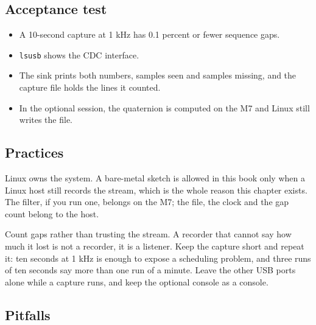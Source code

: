 \subsection*{Acceptance test}

\begin{itemize}
\item A 10-second capture at 1 kHz has 0.1 percent or fewer sequence gaps.
\item \texttt{lsusb} shows the CDC interface.
\item The sink prints both numbers, samples seen and samples missing, and the capture file
holds the lines it counted.
\item In the optional session, the quaternion is computed on the M7 and Linux still writes
the file.
\end{itemize}

\subsection*{Practices}

Linux owns the system. A bare-metal sketch is allowed in this book only when a Linux host
still records the stream, which is the whole reason this chapter exists. The filter, if you
run one, belongs on the M7; the file, the clock and the gap count belong to the host.

Count gaps rather than trusting the stream. A recorder that cannot say how much it lost is
not a recorder, it is a listener. Keep the capture short and repeat it: ten seconds at
1 kHz is enough to expose a scheduling problem, and three runs of ten seconds say more than
one run of a minute. Leave the other USB ports alone while a capture runs, and keep the
optional console as a console.

\subsection*{Pitfalls}

